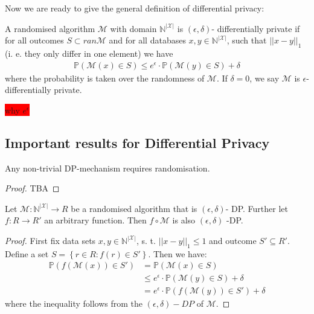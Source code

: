 Now we are ready to give the general definition of differential privacy:
\begin{definition}
    A randomised algorithm $\mathcal{M}$ with domain $\mathbb{N}^{|\mathcal{X}|}$ is $(\epsilon, \delta)$- differentially private if for all outcomes $S \subset ran \mathcal{M}$ and for all databases $x,y \in \mathbb{N}^{|\mathcal{X}|}$, such that $||x-y||_1$ (i. e. they only differ in one element) we have
    \begin{align}
        \mathbb{P}(\mathcal{M}(x) \in S) \le e^\epsilon \cdot \mathbb{P}(\mathcal{M}(y) \in S) + \delta 
    \end{align}
    where the probability is taken over the randomness of $\mathcal{M}$. If $\delta=0$, we say $\mathcal{M}$ is $\epsilon$-differentially private.
\end{definition}

\colorbox{red}{why $e^\epsilon$}

\begin{ex}
    
\end{ex}

\subsection{Important results for Differential Privacy}

\begin{thm} \label{thm:dp_random}
    Any non-trivial DP-mechanism requires randomisation.
\end{thm}
\begin{proof}
    TBA
\end{proof}

\begin{thm} \label{thm:postpro}
    Let $\mathcal{M}: \mathbb{N}^{|\mathcal{X}|} \rightarrow R$ be a randomised algorithm that is $(\epsilon, \delta)$- DP. Further let $f: R \rightarrow R'$ an arbitrary function. Then $f \circ \mathcal{M}$ is also $(\epsilon, \delta)$ -DP.
\end{thm}
\begin{proof}
    First fix data sets $x,y \in \mathbb{N}^{|\mathcal{X}|}$, s. t. $||x-y||_1\le 1$ and outcome $S' \subseteq R'$. Define a set $S=\left\{r\in R: f(r) \in S'\right\}$. Then we have:
    \begin{align}
        \mathbb{P}(f(\mathcal{M}(x))\in S') &= \mathbb{P}(\mathcal{M}(x)\in S) \nonumber \\
        &\le e^\epsilon \cdot \mathbb{P}(\mathcal{M}(y)\in S) + \delta \nonumber \\
        &= e^\epsilon \cdot \mathbb{P}(f(\mathcal{M}(y))\in S') + \delta
    \end{align}
    where the inequality follows from the $(\epsilon, \delta)-DP$ of $\mathcal{M}$.
\end{proof}

